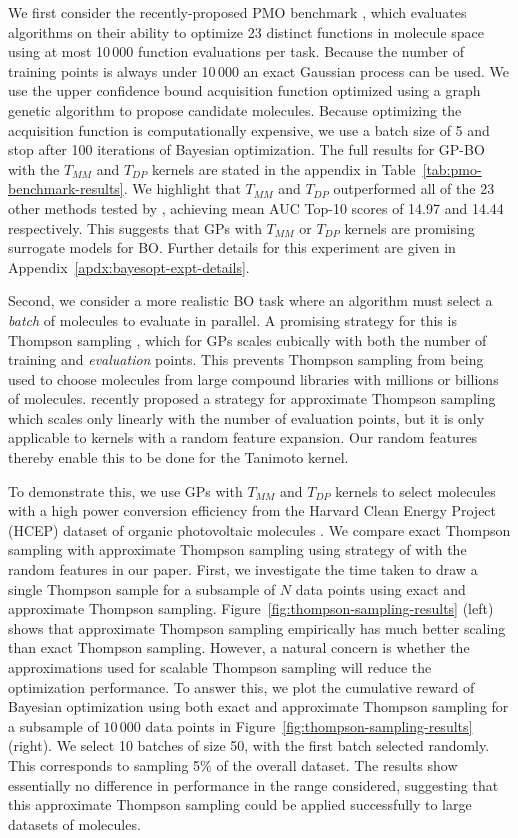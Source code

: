 \documentclass{article}
\theoremstyle{plain}
\theoremstyle{definition}
\theoremstyle{remark}
\begin{document}
We first consider the recently-proposed PMO benchmark \citep{gao2022sample},
which evaluates algorithms on their ability to optimize 23 distinct functions in molecule space
using at most 10\,000 function evaluations per task.
Because the number of training points is always under 10\,000 an exact Gaussian process can be used.
We use the upper confidence bound acquisition function
optimized using a graph genetic algorithm \citep{jensen2019graph} to propose candidate molecules.
Because optimizing the acquisition function is computationally expensive,
we use a batch size of 5 and stop after 100 iterations of Bayesian optimization.
The full results for GP-BO with the $T_{MM}$ and $T_{DP}$ kernels are stated in 
the appendix in Table~\ref{tab:pmo-benchmark-results}.
We highlight that $T_{MM}$ and $T_{DP}$ outperformed all of the 23 other methods tested by \citet{gao2022sample},
achieving mean AUC Top-10 scores of 14.97 and 14.44 respectively.
This suggests that GPs with $T_{MM}$ or $T_{DP}$ kernels are promising surrogate models for BO.
Further details for this experiment are given in Appendix~\ref{apdx:bayesopt-expt-details}.


Second, we consider a more realistic BO task where an algorithm must select a \emph{batch} of molecules to evaluate in parallel.
A promising strategy for this is Thompson sampling \citep{hernandez2017parallel},
which for GPs scales cubically with both the number of training and \emph{evaluation} points.
This prevents Thompson sampling from being used to choose molecules from large compound libraries
with millions or billions of molecules.
\citet{wilson2020efficiently} recently proposed a strategy for approximate Thompson sampling
which scales only linearly with the number of evaluation points,
but it is only applicable to kernels with a random feature expansion.
Our random features thereby enable this to be done for the Tanimoto kernel.

To demonstrate this, we use GPs with $T_{MM}$ and $T_{DP}$ kernels
to select molecules with a high power conversion efficiency from the Harvard Clean Energy Project (HCEP) dataset of
organic photovoltaic molecules \citep{hachmann2011harvard}.
We compare exact Thompson sampling with approximate Thompson sampling using strategy of \citet{wilson2020efficiently}
with the random features in our paper.
First, we investigate the time taken to draw a single Thompson sample for a subsample of $N$ data points
using exact and approximate Thompson sampling.
Figure~\ref{fig:thompson-sampling-results} (left)
shows that approximate Thompson sampling empirically has much better scaling than exact Thompson sampling.
However, a natural concern is whether the approximations used for scalable Thompson sampling
will reduce the optimization performance.
To answer this,
we plot the cumulative reward of Bayesian optimization using both exact and approximate Thompson sampling
for a subsample of $10\,000$ data points in Figure~\ref{fig:thompson-sampling-results} (right).
We select 10 batches of size 50, with the first batch selected randomly.
This corresponds to sampling 5\% of the overall dataset.
The results show essentially no difference in performance in the range considered,
suggesting that this approximate Thompson sampling could be applied successfully to large datasets of molecules.
\end{document}
